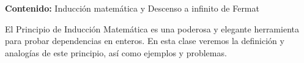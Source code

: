 {\Large\textbf{Contenido:} Inducción matemática y Descenso a infinito de Fermat}


El Principio de Inducción Matemática es una poderosa y elegante herramienta para probar dependencias en enteros.
En esta clase veremos la definición y analogías de este principio, así como ejemplos y problemas.